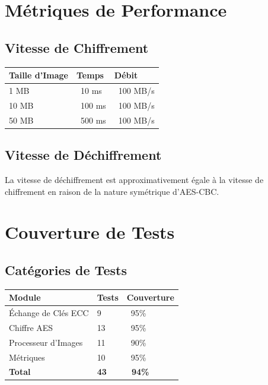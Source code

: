 \documentclass[12pt,a4paper]{report}
\begin{document}
\section{Métriques de Performance}

\subsection{Vitesse de Chiffrement}

\begin{table}[H]
    \centering
    \begin{tabular}{|l|l|l|}
    \hline
    \textbf{Taille d'Image} & \textbf{Temps} & \textbf{Débit} \\
    \hline
    1 MB & ~10 ms & ~100 MB/s \\
    10 MB & ~100 ms & ~100 MB/s \\
    50 MB & ~500 ms & ~100 MB/s \\
    \hline
    \end{tabular}
\end{table}

\subsection{Vitesse de Déchiffrement}

La vitesse de déchiffrement est approximativement égale à la vitesse de chiffrement en raison de la nature symétrique d'AES-CBC.

\section{Couverture de Tests}

\subsection{Catégories de Tests}

\begin{table}[H]
    \centering
    \begin{tabular}{|l|l|l|}
    \hline
    \textbf{Module} & \textbf{Tests} & \textbf{Couverture} \\
    \hline
    Échange de Clés ECC & 9 & ~95\% \\
    Chiffre AES & 13 & ~95\% \\
    Processeur d'Images & 11 & ~90\% \\
    Métriques & 10 & ~95\% \\
    \hline
    \textbf{Total} & \textbf{43} & \textbf{~94\%} \\
    \hline
    \end{tabular}
\end{table}
\end{document}
